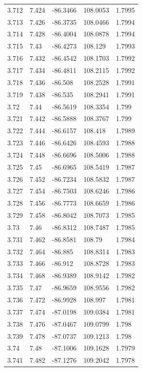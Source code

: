 \begin{tabular}{lllll}
3.712 & 7.424 & -86.3466 & 108.0053 & 1.7995 \\
3.713 & 7.426 & -86.3735 & 108.0466 & 1.7994 \\
3.714 & 7.428 & -86.4004 & 108.0878 & 1.7994 \\
3.715 & 7.43 & -86.4273 & 108.129 & 1.7993 \\
3.716 & 7.432 & -86.4542 & 108.1703 & 1.7992 \\
3.717 & 7.434 & -86.4811 & 108.2115 & 1.7992 \\
3.718 & 7.436 & -86.508 & 108.2528 & 1.7991 \\
3.719 & 7.438 & -86.535 & 108.2941 & 1.7991 \\
3.72 & 7.44 & -86.5619 & 108.3354 & 1.799 \\
3.721 & 7.442 & -86.5888 & 108.3767 & 1.799 \\
3.722 & 7.444 & -86.6157 & 108.418 & 1.7989 \\
3.723 & 7.446 & -86.6426 & 108.4593 & 1.7988 \\
3.724 & 7.448 & -86.6696 & 108.5006 & 1.7988 \\
3.725 & 7.45 & -86.6965 & 108.5419 & 1.7987 \\
3.726 & 7.452 & -86.7234 & 108.5832 & 1.7987 \\
3.727 & 7.454 & -86.7503 & 108.6246 & 1.7986 \\
3.728 & 7.456 & -86.7773 & 108.6659 & 1.7986 \\
3.729 & 7.458 & -86.8042 & 108.7073 & 1.7985 \\
3.73 & 7.46 & -86.8312 & 108.7487 & 1.7985 \\
3.731 & 7.462 & -86.8581 & 108.79 & 1.7984 \\
3.732 & 7.464 & -86.885 & 108.8314 & 1.7983 \\
3.733 & 7.466 & -86.912 & 108.8728 & 1.7983 \\
3.734 & 7.468 & -86.9389 & 108.9142 & 1.7982 \\
3.735 & 7.47 & -86.9659 & 108.9556 & 1.7982 \\
3.736 & 7.472 & -86.9928 & 108.997 & 1.7981 \\
3.737 & 7.474 & -87.0198 & 109.0384 & 1.7981 \\
3.738 & 7.476 & -87.0467 & 109.0799 & 1.798 \\
3.739 & 7.478 & -87.0737 & 109.1213 & 1.798 \\
3.74 & 7.48 & -87.1006 & 109.1628 & 1.7979 \\
3.741 & 7.482 & -87.1276 & 109.2042 & 1.7978 \\

\end{tabular}
